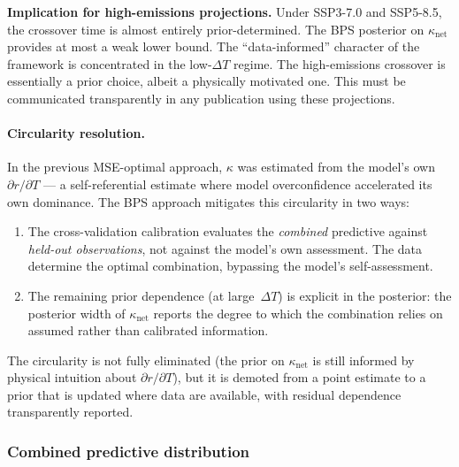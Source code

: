 \documentclass[11pt]{article}
\newcommand{\dT}{\Delta T}
\begin{document}
\textbf{Implication for high-emissions projections.}  Under SSP3-7.0 and SSP5-8.5, the crossover time is almost entirely prior-determined.  The BPS posterior on $\kappa_{\mathrm{net}}$ provides at most a weak lower bound.  The ``data-informed'' character of the framework is concentrated in the low-$\dT$ regime.  The high-emissions crossover is essentially a prior choice, albeit a physically motivated one.  This must be communicated transparently in any publication using these projections.

\paragraph{Circularity resolution.}
\label{sec:kappa_circularity}
In the previous MSE-optimal approach, $\kappa$ was estimated from the model's own $\partial r / \partial T$ --- a self-referential estimate where model overconfidence accelerated its own dominance.  The BPS approach mitigates this circularity in two ways:
\begin{enumerate}
  \item The cross-validation calibration evaluates the \emph{combined} predictive against \emph{held-out observations}, not against the model's own assessment.  The data determine the optimal combination, bypassing the model's self-assessment.
  \item The remaining prior dependence (at large~$\dT$) is explicit in the posterior: the posterior width of $\kappa_{\mathrm{net}}$ reports the degree to which the combination relies on assumed rather than calibrated information.
\end{enumerate}
The circularity is not fully eliminated (the prior on $\kappa_{\mathrm{net}}$ is still informed by physical intuition about $\partial r / \partial T$), but it is demoted from a point estimate to a prior that is updated where data are available, with residual dependence transparently reported.


\subsubsection{Combined predictive distribution}
\label{sec:combined_predictive}
\end{document}
